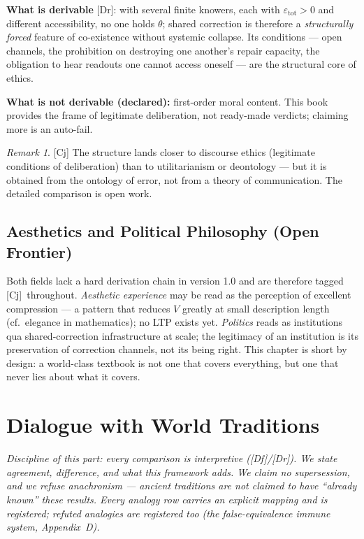 \documentclass[11pt,a4paper,twoside]{book}
\newcommand{\tier}[1]{\textnormal{\small\textsf{[#1]}}}
\newcommand{\Dr}{\tier{Dr}}\newcommand{\Cj}{\tier{Cj}}\newcommand{\Wf}{\tier{Wf}}
\newcommand{\Df}{\tier{Df}}\newcommand{\OpenT}{\tier{Open}}
\theoremstyle{plain}
\theoremstyle{definition}
\theoremstyle{remark}
\newtheorem{remark}[theorem]{Remark}
\begin{document}
\textbf{What is derivable} \Dr: with several finite knowers, each with
$\varepsilon_{\mathrm{tot}}>0$ and different accessibility, no one holds
$\theta$; shared correction is therefore a \emph{structurally forced} feature
of co-existence without systemic collapse. Its conditions --- open channels,
the prohibition on destroying one another's repair capacity, the obligation
to hear readouts one cannot access oneself --- are the structural core of
ethics.

\textbf{What is not derivable (declared):} first-order moral content.
This book provides the frame of legitimate deliberation, not ready-made
verdicts; claiming more is an auto-fail.

\begin{remark}\Cj
The structure lands closer to discourse ethics (legitimate conditions of
deliberation) than to utilitarianism or deontology --- but it is obtained
from the ontology of error, not from a theory of communication. The detailed
comparison is open work.
\end{remark}

\chapter{Aesthetics and Political Philosophy (Open Frontier)}

Both fields lack a hard derivation chain in version 1.0 and are therefore
tagged \Cj\ throughout. \emph{Aesthetic experience} may be read as the
perception of excellent compression --- a pattern that reduces $V$ greatly at
small description length (cf.\ elegance in mathematics); no LTP exists yet.
\emph{Politics} reads as institutions qua shared-correction infrastructure at
scale; the legitimacy of an institution is its preservation of correction
channels, not its being right. This chapter is short by design: a world-class
textbook is not one that covers everything, but one that never lies about
what it covers.

\part{Dialogue with World Traditions}

\noindent\emph{Discipline of this part: every comparison is interpretive
(\Df/\Dr). We state agreement, difference, and what this framework adds. We
claim no supersession, and we refuse anachronism --- ancient traditions are
not claimed to have ``already known'' these results. Every analogy row
carries an explicit mapping and is registered; refuted analogies are
registered too (the false-equivalence immune system, Appendix~D).}
\end{document}
